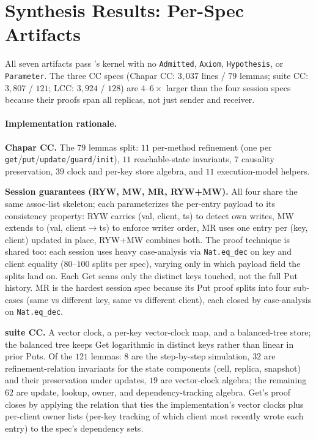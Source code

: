 \section{Synthesis Results: Per-Spec Artifacts}
\label{app:synth-results}

All seven artifacts pass \coq{}'s kernel with no \texttt{Admitted}, \texttt{Axiom}, \texttt{Hypothesis}, or \texttt{Parameter}. The three CC specs (Chapar CC: $3{,}037$ lines / $79$ lemmas; \sys{} suite CC: $3{,}807$ / $121$; LCC: $3{,}924$ / $128$) are $4$--$6\times$ larger than the four session specs because their proofs span all replicas, not just sender and receiver.



\paragraph{Implementation rationale.}

\textbf{Chapar CC.} The $79$ lemmas split: $11$ per-method refinement (one per \texttt{get}/\texttt{put}/\texttt{update}/\texttt{guard}/\texttt{init}), $11$ reachable-state invariants, $7$ causality preservation, $39$ clock and per-key store algebra, and $11$ execution-model helpers.

\textbf{Session guarantees (RYW, MW, MR, RYW+MW).} All four share the same assoc-list skeleton; each parameterizes the per-entry payload to its consistency property: RYW carries (val, client, ts) to detect own writes, MW extends to (val, client$\to$ts) to enforce writer order, MR uses one entry per (key, client) updated in place, RYW+MW combines both. The proof technique is shared too: each session uses heavy case-analysis via \texttt{Nat.eq\_dec} on key and client equality ($80$--$100$ splits per spec), varying only in which payload field the splits land on. Each Get scans only the distinct keys touched, not the full Put history. MR is the hardest session spec because its Put proof splits into four sub-cases (same vs different key, same vs different client), each closed by case-analysis on \texttt{Nat.eq\_dec}.

\textbf{\sys{} suite CC.} A vector clock, a per-key vector-clock map, and a balanced-tree store; the balanced tree keeps Get logarithmic in distinct keys rather than linear in prior Puts. Of the $121$ lemmas: $8$ are the step-by-step simulation, $32$ are refinement-relation invariants for the state components (cell, replica, snapshot) and their preservation under updates, $19$ are vector-clock algebra; the remaining $62$ are update, lookup, owner, and dependency-tracking algebra. Get's proof closes by applying the relation that ties the implementation's vector clocks plus per-client owner lists (per-key tracking of which client most recently wrote each entry) to the spec's dependency sets.

